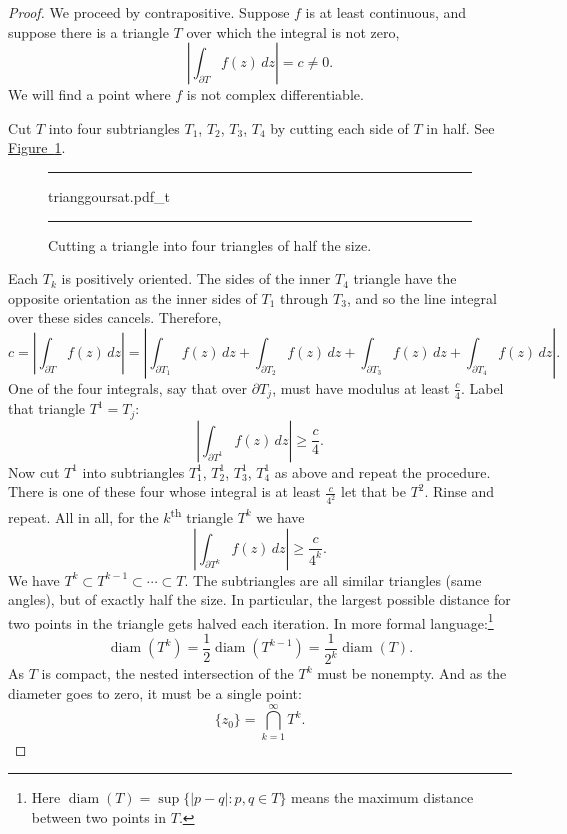 \documentclass[12pt,openany]{book}
\newcommand{\sabs}[1]{\lvert {#1} \rvert}
\newcommand{\abs}[1]{\left\lvert {#1} \right\rvert}
\theoremstyle{plain}
\theoremstyle{remark}
\theoremstyle{definition}
\newenvironment{myfig}{%
\begin{figure}[h!t]
\noindent\rule{\textwidth}{0.4pt}\vspace{12pt}\par\centering}%
{\par\noindent\rule{\textwidth}{0.4pt}
\end{figure}}
\theoremstyle{exercise}
\theoremstyle{example}
\newcommand{\figureref}[1]{\hyperref[#1]{Figure~\ref*{#1}}}
\begin{document}
\begin{proof}
We proceed by contrapositive.
Suppose $f$ is at least continuous, and 
suppose there is a triangle $T$ over which the integral is not zero,
\begin{equation*}
\abs{\int_{\partial T} f(z) \, dz} = c \not= 0 .
\end{equation*}
We will find a point
where $f$ is not complex differentiable.

Cut $T$ into four subtriangles
$T_1$, $T_2$, $T_3$, $T_4$ by cutting each side of $T$ in half.  See
\figureref{fig:trianggoursat}.
\begin{myfig}
{trianggoursat.pdf_t}
\caption{Cutting a triangle into four triangles of half the size.%
\label{fig:trianggoursat}}
\end{myfig}

Each $T_k$ is positively oriented.
The sides of the inner $T_4$ triangle have the opposite
orientation as the inner sides of $T_1$ through $T_3$, and
so the line integral over these sides cancels.  Therefore,
\begin{equation*}
c = 
\abs{\int_{\partial T} f(z) \, dz }
=
\abs{\int_{\partial T_1} f(z) \, dz 
+
\int_{\partial T_2} f(z) \, dz 
+
\int_{\partial T_3} f(z) \, dz 
+
\int_{\partial T_4} f(z) \, dz } .
\end{equation*}
One of the four integrals, say that over $\partial T_j$,
must have modulus at least $\frac{c}{4}$.  Label
that triangle $T^1 = T_j$:
\begin{equation*}
\abs{\int_{\partial T^1} f(z) \, dz } \geq \frac{c}{4} .
\end{equation*}
Now cut $T^1$ into subtriangles
$T_1^1$, $T_2^1$, $T_3^1$, $T_4^1$ as above and repeat the procedure.  There
is one of these four whose integral is at least $\frac{c}{4^2}$ let that be
$T^2$.  Rinse and repeat.
All in all, for the $k$\textsuperscript{th} triangle $T^k$ we have
\begin{equation*}
\abs{\int_{\partial T^k} f(z) \, dz } \geq \frac{c}{4^k} .
\end{equation*}
We have $T^k \subset T^{k-1} \subset \cdots \subset T$.
The subtriangles are all similar triangles (same angles),
but of exactly half the size.
In particular,
the largest possible distance for two points in the triangle 
gets halved each iteration.
In more formal language:\footnote{%
Here $\operatorname{diam}(T)= \sup \{ \sabs{p-q} : p,q \in T \}$
means the maximum distance between two points in $T$.}
\begin{equation*}
\operatorname{diam}(T^k) =
\frac{1}{2} \operatorname{diam}(T^{k-1})
=
\frac{1}{2^k} \operatorname{diam}(T) .
\end{equation*}
As $T$ is compact, the nested intersection of the $T^k$ must be nonempty.
And as the diameter goes to zero, it must be a single point:
\begin{equation*}
\{ z_0 \} = \bigcap_{k=1}^\infty T^k .
\end{equation*}


\end{proof}
\end{document}
